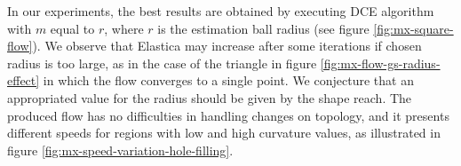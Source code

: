 \documentclass[smallextended]{svjour3}       %
\begin{document}
{In our experiments, the best results are obtained by executing DCE algorithm with $m$ equal to $r$, where $r$ is
  the estimation ball radius (see figure \ref{fig:mx-square-flow}). We observe that Elastica may increase after some
  iterations if chosen radius is too large, as in the case of the triangle in figure \ref{fig:mx-flow-gs-radius-effect}
  in which the flow converges to a single point. We conjecture that an appropriated value for the radius should be given
  by the shape reach.  The produced flow has no difficulties in handling changes on topology, and it presents different
  speeds for regions with low and high curvature values, as illustrated in figure
  \ref{fig:mx-speed-variation-hole-filling}.

\begin{figure}[hp!]
\center				
		\setcounter{subfigure}{-3}
\end{figure}}
\end{document}
